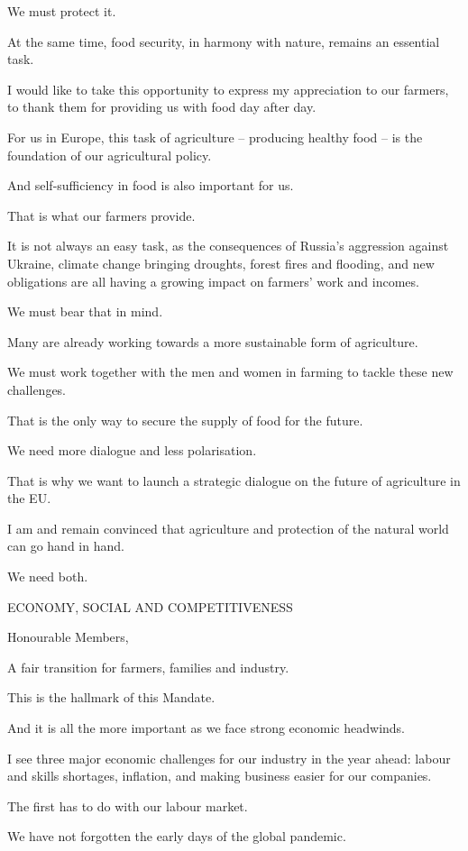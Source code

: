 \documentclass[a4paper,11pt]{article}
\begin{document}
We must protect it.

At the same time, food security, in harmony with nature, remains an essential task.

I would like to take this opportunity to express my appreciation to our farmers, to thank them for providing us with food day after day.

For us in Europe, this task of agriculture – producing healthy food – is the foundation of our agricultural policy.

And self-sufficiency in food is also important for us.

That is what our farmers provide.

It is not always an easy task, as the consequences of Russia's aggression against Ukraine, climate change bringing droughts, forest fires and flooding, and new obligations are all having a growing impact on farmers' work and incomes.

We must bear that in mind.

Many are already working towards a more sustainable form of agriculture.

We must work together with the men and women in farming to tackle these new challenges.

That is the only way to secure the supply of food for the future.

We need more dialogue and less polarisation.

That is why we want to launch a strategic dialogue on the future of agriculture in the EU.

I am and remain convinced that agriculture and protection of the natural world can go hand in hand.

We need both.

 

ECONOMY, SOCIAL AND COMPETITIVENESS

Honourable Members,

A fair transition for farmers, families and industry.

This is the hallmark of this Mandate.

And it is all the more important as we face strong economic headwinds.

I see three major economic challenges for our industry in the year ahead: labour and skills shortages, inflation, and making business easier for our companies. 

The first has to do with our labour market. 

We have not forgotten the early days of the global pandemic.
\end{document}
